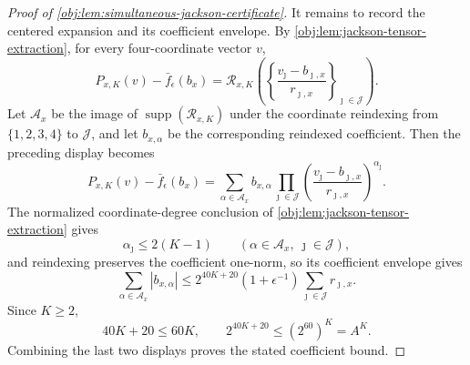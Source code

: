 \begin{proof}[Proof of \cref{obj:lem:simultaneous-jackson-certificate}]
It remains to record the centered expansion and its coefficient envelope. By
\cref{obj:lem:jackson-tensor-extraction}, for every four-coordinate vector \(v\),
\[
P_{x,K}(v)-\bar f_\epsilon(b_x)
=
\mathcal R_{x,K}\left(
\left\{\frac{v_{\jmath}-b_{\jmath,x}}{r_{\jmath,x}}\right\}_{\jmath\in\mathcal J}
\right).
\]
Let \(\mathcal A_x\) be the image of \(\operatorname{supp}(\mathcal R_{x,K})\) under the coordinate reindexing
from \(\{1,2,3,4\}\) to \(\mathcal J\), and let \(b_{x,\alpha}\) be the corresponding reindexed coefficient.
Then the preceding display becomes
\[
P_{x,K}(v)-\bar f_\epsilon(b_x)
=
\sum_{\alpha\in\mathcal A_x}
b_{x,\alpha}
\prod_{\jmath\in\mathcal J}
\left(\frac{v_{\jmath}-b_{\jmath,x}}{r_{\jmath,x}}\right)^{\alpha_{\jmath}}.
\]
The normalized coordinate-degree conclusion of \cref{obj:lem:jackson-tensor-extraction} gives
\[
\alpha_{\jmath}\le 2(K-1)
\qquad
(\alpha\in\mathcal A_x,\ \jmath\in\mathcal J),
\]
and reindexing preserves the coefficient one-norm, so its coefficient envelope gives
\[
\sum_{\alpha\in\mathcal A_x}|b_{x,\alpha}|
\le
2^{40K+20}(1+\epsilon^{-1})
\sum_{\jmath\in\mathcal J}r_{\jmath,x}.
\]
Since \(K\ge2\),
\[
40K+20\le60K,
\qquad
2^{40K+20}\le (2^{60})^K=A^K.
\]
Combining the last two displays proves the stated coefficient bound.
\end{proof}
